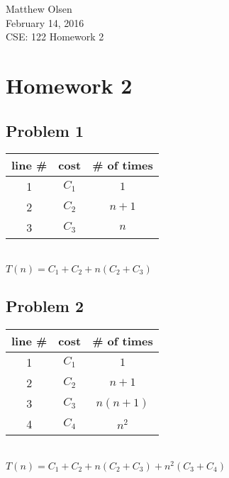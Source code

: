 \documentclass[a4paper,12pt]{article}
\begin{document}
\begin{flushright}
Matthew Olsen\\
February 14, 2016\\ 
CSE: 122 Homework 2\\
\end{flushright}

\section{Homework 2}
        \subsection{Problem 1}
        \begin{center}
        \begin{tabular}{ c|c|c }
        line \# & cost & \# of times \\
        \hline
        1 & $C_1$ & $1$ \\
        2 & $C_2$ & $n + 1$ \\
        3 & $C_3$ & $n$ \\
        \end{tabular} \\
        \vspace{5mm}
        $T(n) = C_1 + C_2 +n(C_2 +C_3)$
        \end{center}	        

        \subsection{Problem 2}
        \begin{center}
        \begin{tabular}{ c|c|c }
        line \# & cost & \# of times \\
        \hline
        1 & $C_1$ & $1$ \\
        2 & $C_2$ & $n + 1$ \\
        3 & $C_3$ & $n(n + 1)$ \\
        4 & $C_4$ & $n^2$ \\
        \end{tabular} \\
        \vspace{5mm}
        $T(n) = C_1 + C_2 +n(C_2 +C_3) + n^2(C_3 + C_4)$
        \end{center}	     
        
\end{document}
